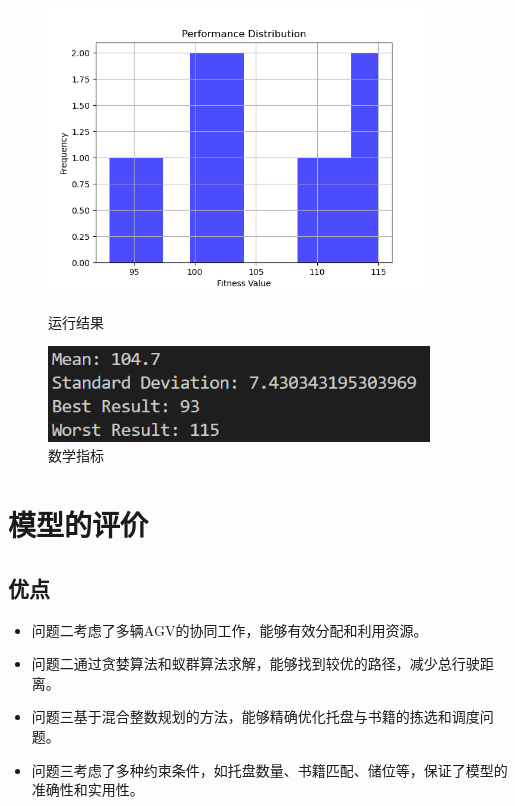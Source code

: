 \documentclass[withoutpreface,bwprint]{thesis-config}
\begin{document}
    \begin{figure}[!htbp]
        \centering
        \begin{minipage}[b]{0.5\linewidth}
            \centering
            \includegraphics[width=0.9\textwidth]{figures/4.3.png}
            \caption{运行结果}
        \end{minipage}%
        \begin{minipage}[b]{0.48\linewidth}
            \centering
            \includegraphics[width=0.9\textwidth]{figures/4.4.png}
            \caption{数学指标}
        \end{minipage}%
    \end{figure}
\newpage
\section{模型的评价}

\subsection{优点}
\begin{itemize}[itemindent=2em]
\item 问题二考虑了多辆AGV的协同工作，能够有效分配和利用资源。
\item 问题二通过贪婪算法和蚁群算法求解，能够找到较优的路径，减少总行驶距离。
\item 问题三基于混合整数规划的方法，能够精确优化托盘与书籍的拣选和调度问题。
\item 问题三考虑了多种约束条件，如托盘数量、书籍匹配、储位等，保证了模型的准确性和实用性。
\end{itemize}
\end{document}

